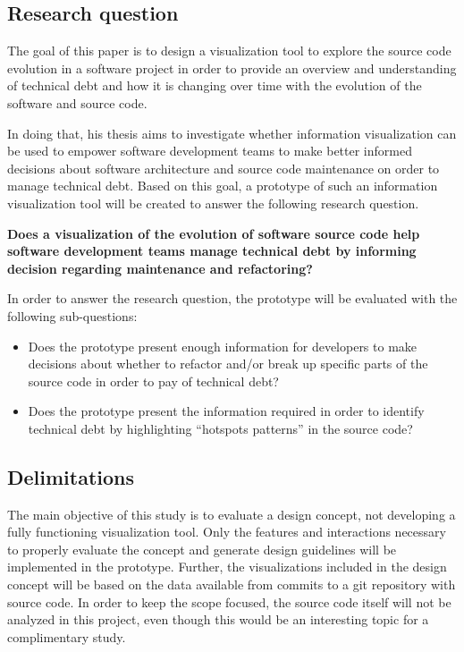 \subsection{Research question}
The goal of this paper is to design a visualization tool to explore the source code evolution in a software project in order to provide an overview and understanding of technical debt and how it is changing over time with the evolution of the software and source code. 

In doing that, his thesis aims to investigate whether information visualization can be used to empower software development teams to make better informed decisions about software architecture and source code maintenance on order to manage technical debt. Based on this goal, a prototype of such an information visualization tool will be created to answer the following research question.


\smallskip
\textbf{
Does a visualization of the evolution of software source code help software development teams manage technical debt by informing decision regarding maintenance and refactoring?
}
\smallskip

In order to answer the research question, the prototype will be evaluated with the following sub-questions:
\begin{itemize}
\item Does the prototype present enough information for developers to make decisions about whether to refactor and/or break up specific parts of the source code in order to pay of technical debt?
\item Does the prototype present the information required in order to identify technical debt by highlighting “hotspots patterns” \cite{mo_hotspot_2015} in the source code?
\end{itemize}

\subsection{Delimitations}
The main objective of this study is to evaluate a design concept, not developing a fully functioning visualization tool. Only the features and interactions necessary to properly evaluate the concept and generate design guidelines will be implemented in the prototype. Further, the visualizations included in the design concept will be based on the data available from commits to a git repository with source code. In order to keep the scope focused, the source code itself will not be analyzed in this project, even though this would be an interesting topic for a complimentary study.